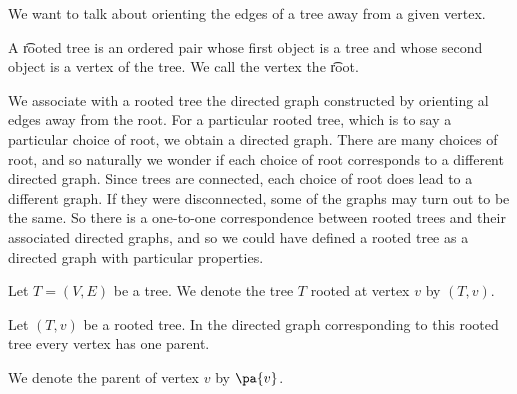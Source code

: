 
\sbasic












\sstart
{}


We want to talk about orienting the edges of a tree away from a given vertex.


A \t{rooted tree} is an ordered pair whose first object is a tree and whose second object is a vertex of the tree. We call the vertex the \t{root}.

We associate with a rooted tree the directed graph constructed by orienting al edges away from the root.
For a particular rooted tree, which is to say a particular choice of root, we obtain a directed graph.
There are many choices of root, and so naturally we wonder if each choice of root corresponds to a different directed graph.
Since trees are connected, each choice of root does lead to a different graph.
If they were disconnected, some of the graphs may turn out to be the same.
So there is a one-to-one correspondence between rooted trees and their associated directed graphs, and so we could have defined a rooted tree as a directed graph with particular properties.


Let $T = (V, E)$ be a tree.
We denote the tree $T$ rooted at vertex $v$ by $(T, v)$.


\begin{prop}
Let $(T, v)$ be a rooted tree.
In the directed graph corresponding to this rooted tree every vertex has one parent.
\end{prop}

We denote the parent of vertex $v$ by $\pa{v}$.
\strats
